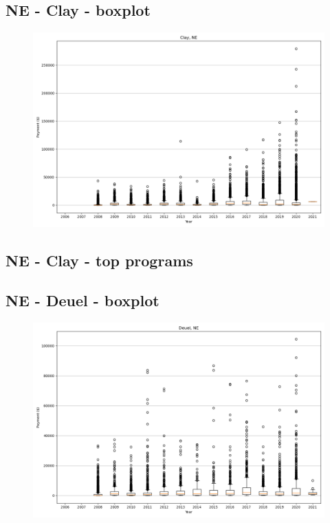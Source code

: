 \subsection*{NE - Clay - boxplot}
\begin{figure}[h]
\centering
\includegraphics[width=7in]{../output/boxplots/counties/Clay-NE_boxplot.png}
\end{figure}


\subsection*{NE - Clay - top programs}

\newpage
\subsection*{NE - Deuel - boxplot}
\begin{figure}[h]
\centering
\includegraphics[width=7in]{../output/boxplots/counties/Deuel-NE_boxplot.png}
\end{figure}


